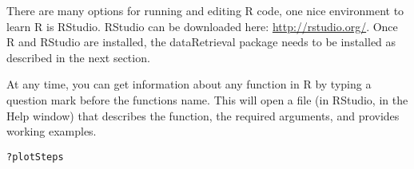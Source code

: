 \documentclass[a4paper,11pt]{article}\usepackage{graphicx, color}
\makeatletter
\newenvironment{kframe}{%
 \def\at@end@of@kframe{}%
 \ifinner\ifhmode%
  \def\at@end@of@kframe{\end{minipage}}%
  \begin{minipage}{\columnwidth}%
 \fi\fi%
 \def\FrameCommand##1{\hskip\@totalleftmargin \hskip-\fboxsep
 \colorbox{shadecolor}{##1}\hskip-\fboxsep
     \hskip-\linewidth \hskip-\@totalleftmargin \hskip\columnwidth}%
 \MakeFramed {\advance\hsize-\width
   \@totalleftmargin\z@ \linewidth\hsize
   \@setminipage}}%
 {\par\unskip\endMakeFramed%
 \at@end@of@kframe}
\newenvironment{knitrout}{}{} %
\makeatother
\begin{document}
There are many options for running and editing R code, one nice environment to learn R is RStudio. RStudio can be downloaded here: \url{http://rstudio.org/}. Once R and RStudio are installed, the dataRetrieval package needs to be installed as described in the next section.

At any time, you can get information about any function in R by typing a question mark before the functions name.  This will open a file (in RStudio, in the Help window) that describes the function, the required arguments, and provides working examples.

\begin{knitrout}
\color{fgcolor}\begin{kframe}
\begin{alltt}
?plotSteps
\end{alltt}
\end{kframe}
\end{knitrout}
\end{document}

